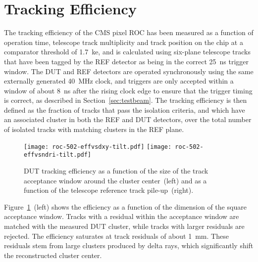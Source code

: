 \documentclass[a4paper,11pt]{article}
\begin{document}
\section{Tracking Efficiency}
\label{sec:efficiency}

The tracking efficiency of the CMS pixel ROC has been measured as a function of operation time, telescope track multiplicity and track position on the chip at a comparator threshold of \SI{1.7}{ke}, and is calculated using six-plane telescope tracks that have been tagged by the REF detector as being in the correct \SI{25}{\nano\second} trigger window.
The DUT and REF detectors are operated synchronously using the same externally generated \SI{40}{\MHz} clock, and triggers are only accepted within a window of about \SI{8}{\nano\second} after the rising clock edge to ensure that the trigger timing is correct, as described in Section~\ref{sec:testbeam}.
The tracking efficiency is then defined as the fraction of tracks that pass the isolation criteria, and which have an associated cluster in both the REF and DUT detectors, over the total number of isolated tracks with matching clusters in the REF plane.
\begin{figure}
  \centering
  \texttt{[image: roc-502-effvsdxy-tilt.pdf]}%
  \texttt{[image: roc-502-effvsndri-tilt.pdf]}
  \caption[Tracking efficiency as a function of the acceptance window and the telescope pile-up]{DUT tracking efficiency as a function of the size of the track acceptance window around the cluster center~(left) and as a function of the telescope reference track pile-up~(right).}
  \label{fig:effxy}
\end{figure}
Figure~\ref{fig:effxy}~(left) shows the efficiency as a function of the dimension of the square acceptance window. Tracks with a residual within the acceptance window are matched with the measured DUT cluster, while tracks with larger residuals are rejected.
The efficiency saturates at track residuals of about \SI{1}{\mm}. These residuals stem from large clusters produced by delta rays, which significantly shift the reconstructed cluster center.
\end{document}
